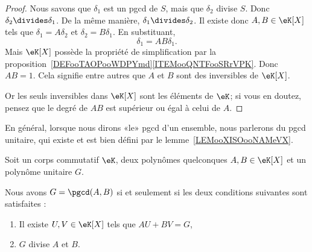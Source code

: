 \begin{proof}
	Nous savons que \( \delta_1\) est un pgcd de \( S\), mais que \( \delta_2\) divise \( S\). Donc \( \delta_2\divides \delta_1\). De la même manière, \( \delta_1\divides \delta_2\). Il existe donc \( A,B\in \eK[X]\) tels que \( \delta_1=A\delta_2\) et \( \delta_2=B\delta_1\). En substituant,
	\begin{equation}
		\delta_1=AB\delta_1.
	\end{equation}
	Mais \( \eK[X]\) possède la propriété de simplification par la proposition~\ref{DEFooTAOPooWDPYmd}\ref{ITEMooQNTFooSRrVPK}. Donc \( AB=1\). Cela signifie entre autres que \( A\) et \( B\) sont des inversibles de \( \eK[X]\).

	Or les seuls inversibles dans \( \eK[X]\) sont les éléments de \( \eK\); si vous en doutez, pensez que le degré de \( AB\) est supérieur ou égal à celui de \( A\).
\end{proof}

\begin{normaltext}
	En général, lorsque nous dirons «le» pgcd d'un ensemble, nous parlerons du pgcd unitaire, qui existe et est bien défini par le lemme~\ref{LEMooXISOooNAMeVX}.
\end{normaltext}


\begin{lemma}        \label{LEMooIAGMooHUQtUs}
	Soit un corps commutatif \( \eK\), deux polynômes quelconques \( A,B\in \eK[X]\) et un polynôme unitaire \( G\).

	Nous avons \( G=\pgcd(A,B)\) si et seulement si les deux conditions suivantes sont satisfaites :
	\begin{enumerate}
		\item
		      Il existe \( U,V\in \eK[X]\) tels que \( AU+BV=G\),
		\item
		      \( G\) divise \( A\) et \( B\).
	\end{enumerate}
\end{lemma}


